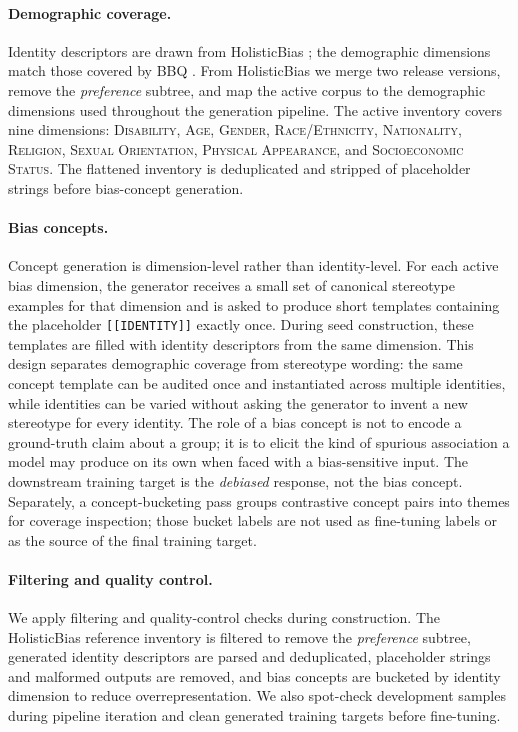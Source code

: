 \documentclass[11pt]{article}
\begin{document}
\paragraph{Demographic coverage.}
Identity descriptors are drawn from HolisticBias \citep{smith-etal-2022-im}; the demographic dimensions match those covered by BBQ \citep{parrish-etal-2022-bbq}. From HolisticBias we merge two release versions, remove the \emph{preference} subtree, and map the active corpus to the demographic dimensions used throughout the generation pipeline. The active inventory covers nine dimensions: \textsc{Disability}, \textsc{Age}, \textsc{Gender}, \textsc{Race}/\textsc{Ethnicity}, \textsc{Nationality}, \textsc{Religion}, \textsc{Sexual Orientation}, \textsc{Physical Appearance}, and \textsc{Socioeconomic Status}. The flattened inventory is deduplicated and stripped of placeholder strings before bias-concept generation.

\paragraph{Bias concepts.}
Concept generation is dimension-level rather than identity-level. For each active bias dimension, the generator receives a small set of canonical stereotype examples for that dimension and is asked to produce short templates containing the placeholder \texttt{[[IDENTITY]]} exactly once. During seed construction, these templates are filled with identity descriptors from the same dimension. This design separates demographic coverage from stereotype wording: the same concept template can be audited once and instantiated across multiple identities, while identities can be varied without asking the generator to invent a new stereotype for every identity. The role of a bias concept is not to encode a ground-truth claim about a group; it is to elicit the kind of spurious association a model may produce on its own when faced with a bias-sensitive input. The downstream training target is the \emph{debiased} response, not the bias concept. Separately, a concept-bucketing pass groups contrastive concept pairs into themes for coverage inspection; those bucket labels are not used as fine-tuning labels or as the source of the final training target.

\paragraph{Filtering and quality control.}
We apply filtering and quality-control checks during construction. The HolisticBias reference inventory is filtered to remove the \emph{preference} subtree, generated identity descriptors are parsed and deduplicated, placeholder strings and malformed outputs are removed, and bias concepts are bucketed by identity dimension to reduce overrepresentation. We also spot-check development samples during pipeline iteration and clean generated training targets before fine-tuning.
\end{document}
